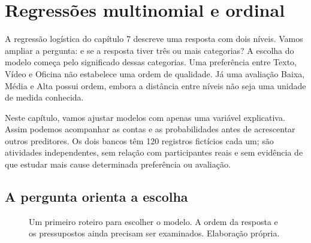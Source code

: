 \chapter{Regressões multinomial e ordinal}
\label{cap:respostas-multiplas}

A regressão logística do capítulo 7 descreve uma resposta com dois níveis. Vamos ampliar a pergunta: e se a resposta tiver três ou mais categorias? A escolha do modelo começa pelo significado dessas categorias. Uma preferência entre Texto, Vídeo e Oficina não estabelece uma ordem de qualidade. Já uma avaliação Baixa, Média e Alta possui ordem, embora a distância entre níveis não seja uma unidade de medida conhecida.

Neste capítulo, vamos ajustar modelos com apenas uma variável explicativa. Assim podemos acompanhar as contas e as probabilidades antes de acrescentar outros preditores. Os dois bancos têm 120 registros fictícios cada um; são atividades independentes, sem relação com participantes reais e sem evidência de que estudar mais cause determinada preferência ou avaliação.

\section{A pergunta orienta a escolha}

\begin{figure}[H]
\centering
{}
\caption{Um primeiro roteiro para escolher o modelo. A ordem da resposta e os pressupostos ainda precisam ser examinados. Elaboração própria.}
\end{figure}

